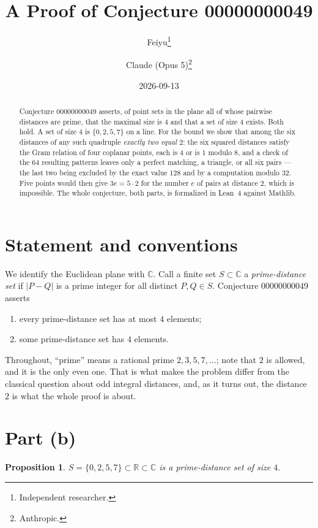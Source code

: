 \documentclass[11pt]{article}
\title{A Proof of Conjecture 00000000049}
\author{%
  Feiyu\thanks{Independent researcher.}
  \and
  Claude (Opus 5)\thanks{Anthropic.}%
}
\date{2026-09-13}
\theoremstyle{plain}
\newtheorem{proposition}[theorem]{Proposition}
\theoremstyle{definition}
\theoremstyle{remark}
\begin{document}
\maketitle

\begin{abstract}
Conjecture 00000000049 asserts, of point sets in the plane all of whose pairwise
distances are prime, that the maximal size is $4$ and that a set of size $4$
exists. Both hold. A set of size $4$ is $\{0,2,5,7\}$ on a line. For the bound
we show that among the six distances of any such quadruple \emph{exactly two
equal $2$}: the six squared distances satisfy the Gram relation of four coplanar
points, each is $4$ or is $1$ modulo $8$, and a check of the $64$ resulting
patterns leaves only a perfect matching, a triangle, or all six pairs --- the
last two being excluded by the exact value $128$ and by a computation modulo
$32$. Five points would then give $3e=5\cdot2$ for the number $e$ of pairs at
distance $2$, which is impossible. The whole conjecture, both parts, is
formalized in Lean~4 against Mathlib.
\end{abstract}

\section{Statement and conventions}

We identify the Euclidean plane with $\mathbb C$. Call a finite set
$S\subset\mathbb C$ a \emph{prime-distance set} if $|P-Q|$ is a prime integer
for all distinct $P,Q\in S$. Conjecture 00000000049 asserts
\begin{enumerate}
  \item[(a)] every prime-distance set has at most $4$ elements;
  \item[(b)] some prime-distance set has $4$ elements.
\end{enumerate}

Throughout, ``prime'' means a rational prime $2,3,5,7,\ldots$; note that $2$ is
allowed, and it is the only even one. That is what makes the problem differ from
the classical question about odd integral distances, and, as it turns out, the
distance $2$ is what the whole proof is about.

\section{Part (b)}

\begin{proposition}\label{prop:b}
$S=\{0,2,5,7\}\subset\mathbb R\subset\mathbb C$ is a prime-distance set of size
$4$.
\end{proposition}
\end{document}
